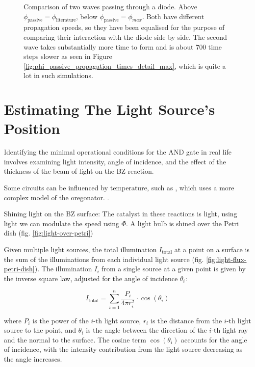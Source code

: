 \begin{figure}
	\caption{Comparison of two waves passing through a diode. Above $\phi_{\text{passive}} = \phi_{\text{literature}}$, below $\phi_{\text{passive}} = \phi_{max}$. Both have different propagation speeds, so they have been equalised for the purpose of comparing their interaction with the diode side by side. The second wave takes substantially more time to form and is about 700 time steps slower as seen in Figure \ref{fig:phi_passive_propagation_times_detail_max}, which is quite a lot in such simulations.}
	\label{fig:comparison_diode}
\end{figure}

\section{Estimating The Light Source's Position}\label{sec:light-imperfections}



Identifying the minimal operational conditions for the AND gate in real life involves examining light intensity, angle of incidence, and the effect of the thickness of the beam of light on the BZ reaction.


Some circuits  can be influenced by temperature, such as \cite{yamada2022artificial}, which uses a more complex model of the oregonator.  .


Shining light on the BZ surface: \citep{barry1979methods}
The catalyst in these reactions is light, using light we can modulate the speed using $\Phi$.
A light bulb is shined over the Petri dish (fig. \ref{fig:light-over-petri})

Given multiple light sources, the total illumination $I_{\text{total}}$ at a point on a surface is the sum of the illuminations from each individual light source (fig. \ref{fig:light-flux-petri-dish}). The illumination $I_i$ from a single source at a given point is given by the inverse square law, adjusted for the angle of incidence $\theta_i$:

\[
I_{\text{total}} = \sum_{i=1}^{n} \frac{P_i}{4\pi r_i^2} \cdot \cos(\theta_i)
\]

where $P_i$ is the power of the $i$-th light source, $r_i$ is the distance from the $i$-th light source to the point, and $\theta_i$ is the angle between the direction of the $i$-th light ray and the normal to the surface. The cosine term $\cos(\theta_i)$ accounts for the angle of incidence, with the intensity contribution from the light source decreasing as the angle increases.




